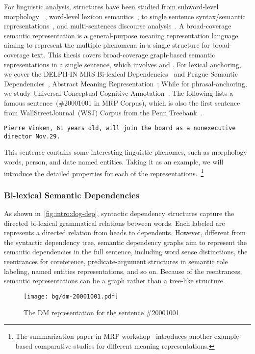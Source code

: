 For linguistic analysis, structures have been studied from
subword-level morphology ~\citep{beesley2003finite}, word-level
lexicon semantics~\citep{miller1998wordnet}, to single sentence
syntax/semantic
representations~\citep{baker1998berkeley,palmer2005proposition,collins2003head},
and multi-sentences discourse
analysis~\citep{carlson2003building,wolf2005representing,prasad2008penn}. A
broad-coverage semantic representation is a general-purpose meaning
representation language aiming to represent the multiple phenomena in
a single structure for broad-coverage text. This thesis covers
broad-coverage graph-based semantic representations in a single
sentence, which involves  and
. For lexical anchoring, we cover the DELPH-IN
MRS Bi-lexical Dependencies~\cite[DM,][]{ivanova2012did} and Prague
Semantic
Dependencies~\cite[PSD,][]{hajic2012announcing,miyao2014house},
Abstract Meaning Representation~\cite[AMR,][]{Ban:Bon:Cai:13}; While
for phrasal-anchoring, we study Universal Conceptual Cognitive
Annotation~\cite[UCCA,][]{Abe:Rap:13b}. The following lists a famous
sentence~(\#20001001 in MRP Corpus), which is also the first sentence
from WallStreetJournal~(WSJ) Corpus from the Penn
Treebank~\citep{Mar:San:Mar:93}.

\texttt{Pierre Vinken, 61 years old, will join the board as a nonexecutive director Nov.29.}

This sentence contains some interesting linguistic phenomes, such as
morphology words, person, and date named entities. Taking it as an
example, we will introduce the detailed properties for each of the
representations.~\footnote{The summarization paper in MRP
  workshop~\citep{Mar:San:Mar:93} introduces another example-based
  comparative studies for different meaning representations.}

\subsubsection{Bi-lexical Semantic Dependencies}
\label{ssec:bg:bi-leixcal}

As shown in~\autoref{fig:intro:dog-dep}, syntactic dependency
structures capture the directed bi-lexical grammatical relations
between words. Each labeled arc represents a directed relation from
heads to dependents. However, different from the syntactic dependency
tree, semantic dependency graphs aim to represent the semantic
dependencies in the full sentence, including word sense distinctions,
the reentrances for coreference, predicate-argument structures in
semantic role labeling, named entities representations, and so
on. Because of the reentrances, semantic representations can be a
graph rather than a tree-like structure.
\begin{figure}[!th]
\centering
\texttt{[image: bg/dm-20001001.pdf]}
\caption{\label{fig:bg:dm}The DM representation for the sentence
  \#20001001}
\end{figure}


